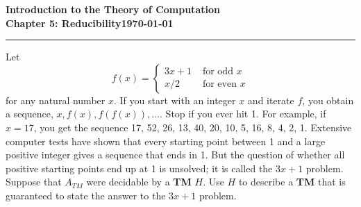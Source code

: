 \documentclass[11pt]{article}
\newcommand{\dated}{\today}
\begin{document}
\textbf{Introduction to the Theory of
Computation}\hfill\textbf{\myname}\\[0.01in]
\textbf{Chapter 5: Reducibility}\hfill\textbf{\dated}\\
\smallskip\hrule\bigskip

\begin{problem}{5.31}
Let
\[
f(x) =\begin{cases}
3x+1 & \text{ for odd } x \\
x/2 & \text{ for even } x
\end{cases}
\]
for any natural number $x$. If you start with an integer $x$ and iterate $f$, you obtain a sequence, $x, f(x), f(f(x)),\dots$. Stop if you ever hit 1. For example, if $x = 17$, you get the sequence 17, 52, 26, 13, 40, 20, 10, 5, 16, 8, 4, 2, 1. Extensive computer tests have shown that every starting point between 1 and a large positive integer gives a sequence that ends in 1. But the question of whether all positive starting
points end up at 1 is unsolved; it is called the $3x + 1$ problem.
Suppose that $A_{TM}$ were decidable by a \textbf{TM} $H$. Use $H$ to describe a \textbf{TM} that is guaranteed to state the answer to the $3x + 1$ problem.
\end{problem}
\end{document}
